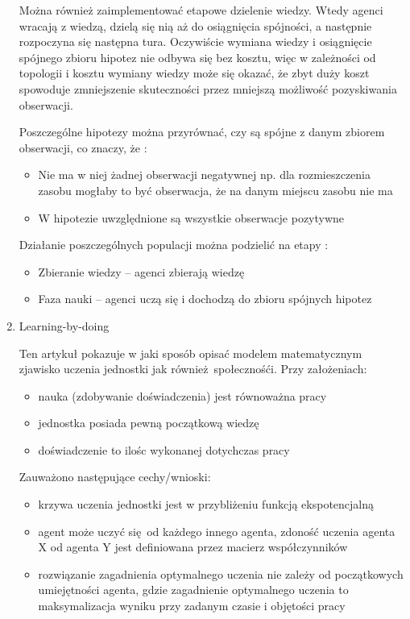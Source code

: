 \documentclass[11pt]{aghdpl}
\begin{document}
\begin{enumerate}
Można również zaimplementować etapowe dzielenie wiedzy. Wtedy agenci wracają z wiedzą, dzielą się nią aż do osiągnięcia spójności, a następnie rozpoczyna się następna tura. Oczywiście wymiana wiedzy i osiągnięcie spójnego zbioru hipotez nie odbywa się bez kosztu, więc w zależności od topologii i kosztu wymiany wiedzy może się okazać, że zbyt duży koszt spowoduje zmniejszenie skuteczności przez mniejszą możliwość pozyskiwania obserwacji.

Poszczególne hipotezy można przyrównać, czy są spójne z danym zbiorem obserwacji, co znaczy, że :
\begin{itemize}
        \item Nie ma w niej żadnej obserwacji negatywnej np. dla rozmieszczenia zasobu mogłaby to być obserwacja, że na danym miejscu zasobu nie ma
        \item W hipotezie uwzględnione są wszystkie obserwacje pozytywne
\end{itemize}

Działanie poszczególnych populacji można podzielić na etapy :

\begin{itemize}
        \item Zbieranie wiedzy – agenci zbierają wiedzę
        \item Faza nauki – agenci uczą się i dochodzą do zbioru spójnych hipotez
\end{itemize}

\item Learning-by-doing \cite{LearningByDoing}

Ten artykuł pokazuje w jaki sposób opisać modelem matematycznym zjawisko uczenia jednostki jak również społecznośći. Przy założeniach:

\begin{itemize}
        \item nauka (zdobywanie doświadczenia) jest równoważna pracy
        \item jednostka posiada pewną początkową wiedzę
        \item doświadczenie to ilośc wykonanej dotychczas pracy
\end{itemize}

Zauważono następujące cechy/wnioski:

\begin{itemize}
        \item krzywa uczenia jednostki jest w przybliżeniu funkcją ekspotencjalną
        \item agent może uczyć się od każdego innego agenta, zdoność uczenia agenta X od agenta Y jest definiowana przez macierz współczynników
        \item rozwiązanie zagadnienia optymalnego uczenia nie zależy od początkowych umiejętności agenta, gdzie zagadnienie optymalnego uczenia to maksymalizacja wyniku przy zadanym czasie i objętości pracy
\end{itemize}


\end{enumerate}
\end{document}
